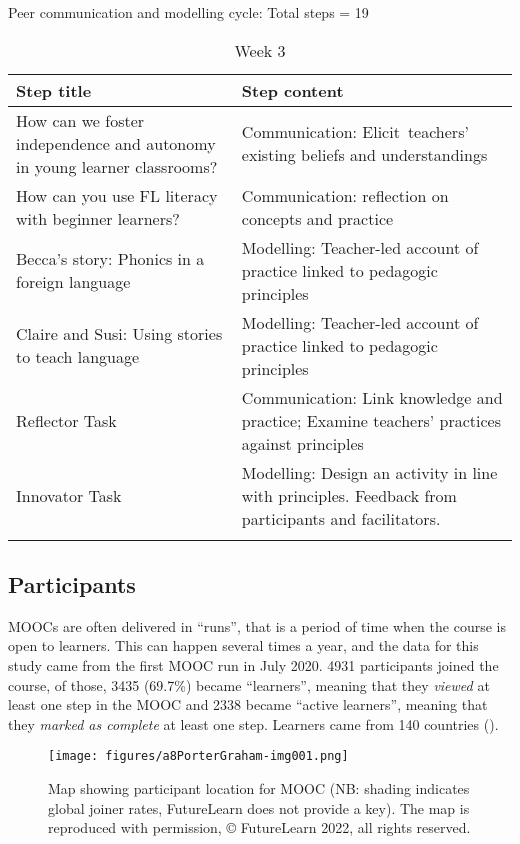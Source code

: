 \documentclass[output=paper]{langscibook}
\begin{document}
\begin{table}
\ContinuedFloat
\caption{Peer communication and modelling cycle: Total steps = 19}
\begin{subtable}{\textwidth}
\caption{Week 3}
\label{tab:porter:4c}
\begin{tabularx}{\textwidth}{QQ}
\lsptoprule
{Step title} & {Step content}\\
\midrule
 How can we foster independence and autonomy in young learner classrooms? & Communication: Elicit~teachers’ existing beliefs and understandings~\\
 \tablevspace
 How can you use FL literacy with beginner learners? & Communication: reflection on concepts and practice\\
 \tablevspace
 Becca's story: Phonics in a foreign language & Modelling: Teacher-led account of practice linked to pedagogic principles~\\
 \tablevspace
 Claire and Susi: Using stories to teach language & Modelling: Teacher-led account of practice linked to pedagogic principles~\\
 \tablevspace
 Reflector Task & Communication: Link knowledge and practice; Examine teachers’ practices against principles~\\
 \tablevspace
 Innovator Task & Modelling: Design an activity in line with principles. Feedback from participants and facilitators. \\
\lspbottomrule
\end{tabularx}
\end{subtable}
\end{table}

\subsection{Participants}\label{sec:porter:2.2}

MOOCs are often delivered in ``runs'', that is a period of time when the course is open to learners. This can happen several times a year, and the data for this study came from the first MOOC run in July 2020. 4931 participants joined the course, of those, 3435 (69.7\%) became ``learners'', meaning that they \textit{viewed} at least one step in the MOOC and 2338 became ``active learners'', meaning that they \textit{marked as complete} at least one step. Learners came from 140 countries ().

\begin{figure}
\texttt{[image: figures/a8PorterGraham-img001.png]}
\caption{Map showing participant location for MOOC (NB: shading indicates global joiner rates, FutureLearn does not provide a key). The map is reproduced with permission, © FutureLearn 2022, all rights reserved.}
\label{fig:porter:1}
\end{figure}
\end{document}

